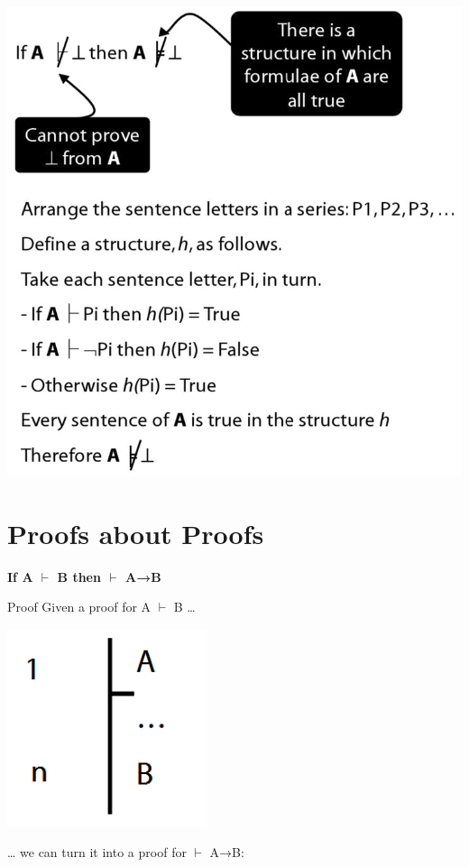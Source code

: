 \documentclass[12pt]{extarticle}
\begin{document}
\begin{multicols*}{3}
\begin{center}
\includegraphics[scale=0.3]{img/unit_450.png}
\end{center}
 
 
\section{Proofs about Proofs}
 
\begin{minipage}{\columnwidth}
 
\textbf{If A $\vdash$ B then $\vdash$ A→B}
 
Proof Given a proof for A $\vdash$ B …
 
\begin{center}
\includegraphics[scale=0.3]{img/unit_440_a.png}
\end{center}
… we can turn it into a proof for $\vdash$ A→B:
 

\end{minipage}
\end{multicols*}
\end{document}
